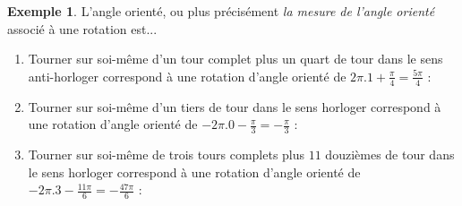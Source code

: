 \documentclass[a4paper,fontsize=13pt]{scrreprt}
\theoremstyle{plain}
\theoremstyle{definition}
\newtheorem{exe}[subsection]{Exemple}
\begin{document}
\begin{exe}
L'angle orienté, ou plus précisément \emph{la mesure de l'angle orienté} associé à une rotation est...
\begin{enumerate}
\item Tourner sur soi-même d'un tour complet plus un quart de tour dans le sens anti-horloger correspond à une rotation d'angle orienté de $2\pi.1 + \frac{\pi}{4} = \frac{5\pi}{4}$ :
\begin{center}
\end{center}
\item Tourner sur soi-même d'un tiers de tour dans le sens horloger correspond à une rotation d'angle orienté de $-2\pi.0 - \frac{\pi}{3} = - \frac{\pi}{3}$ :
\begin{center}
\end{center}
\item Tourner sur soi-même de trois tours complets plus $11$ douzièmes de tour dans le sens horloger correspond à une rotation d'angle orienté de $-2\pi.3 - \frac{11\pi}{6} = - \frac{47\pi}{6}$ :
\begin{center}
\end{center}
\end{enumerate}
\end{exe}
\end{document}
